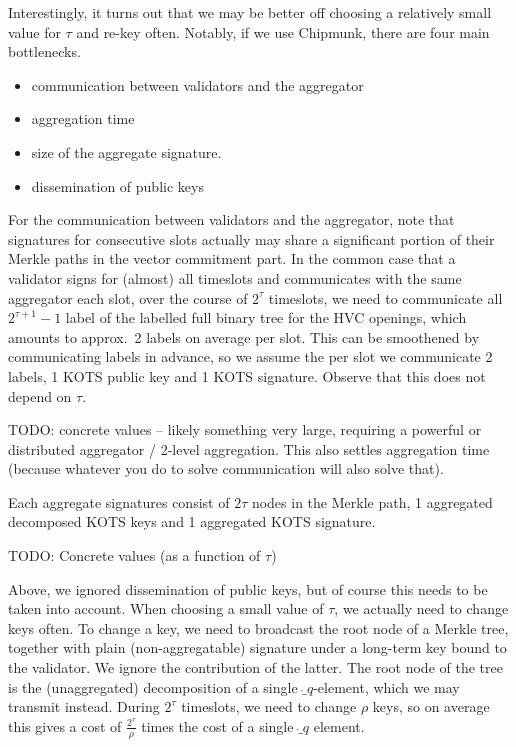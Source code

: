 Interestingly, it turns out that we may be better off choosing a relatively small value for $\tau$ and re-key often. Notably, if we use Chipmunk, there are four main bottlenecks.
\begin{itemize}
\item communication between validators and the aggregator
\item aggregation time
\item size of the aggregate signature.
\item dissemination of public keys
\end{itemize}
For the communication between validators and the aggregator, note that signatures for consecutive slots actually may share a significant portion of their Merkle paths in the vector commitment part. In the common case that a validator signs for (almost) all timeslots and communicates with the same aggregator each slot,
over the course of $2^\tau$ timeslots, we need to communicate all $2^{\tau+1} - 1$ label of the labelled full binary tree for the HVC openings, which amounts to approx.\ 2 labels on average per slot. This can be smoothened by communicating labels in advance, so we assume the per slot we communicate 2 labels, 1 KOTS public key and 1 KOTS signature. Observe that this does not depend on $\tau$.

\bigskip

TODO: concrete values -- likely something very large, requiring a powerful or distributed aggregator / 2-level aggregation. This also settles aggregation time (because whatever you do to solve communication will also solve that).

\bigskip

Each aggregate signatures consist of $2\tau$ nodes in the Merkle path, 1 aggregated decomposed KOTS keys and 1 aggregated KOTS signature.

\bigskip

TODO: Concrete values (as a function of $\tau$)

\bigskip

Above, we ignored dissemination of public keys, but of course this needs to be taken into account. When choosing a small value of $\tau$, we actually need to change keys often. To change a key, we need to broadcast the root node of a Merkle tree, together with plain (non-aggregatable) signature under a long-term key bound to the validator. We ignore the contribution of the latter. The root node of the tree is the (unaggregated) decomposition of a single $\ring_q$-element, which we may transmit instead. During $2^\tau$ timeslots, we need to change $\rho$ keys, so on average this gives a cost of $\frac{2^\tau}{\rho}$ times the cost of  a single $\ring_q$ element.

